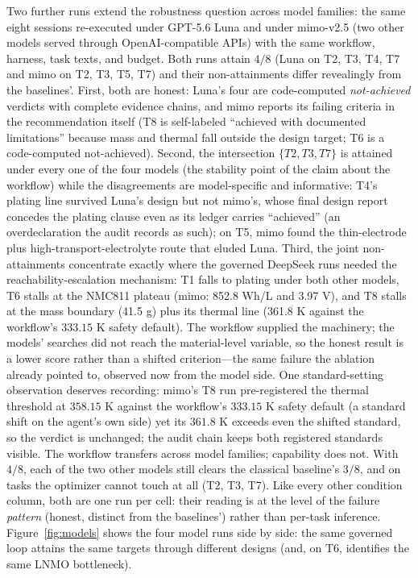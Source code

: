 Two further runs extend the robustness question across model families:
the same eight sessions re-executed under GPT-5.6 Luna and under
mimo-v2.5 (two other models served through OpenAI-compatible
APIs) with the same workflow, harness, task texts, and budget. Both runs
attain $4/8$ (Luna on T2, T3, T4, T7 and mimo on T2, T3, T5, T7) and
their non-attainments differ revealingly from the baselines'. First, both
are honest: Luna's four are code-computed \emph{not-achieved} verdicts with
complete evidence chains, and mimo reports its failing criteria in the
recommendation itself (T8 is self-labeled ``achieved with documented
limitations'' because mass and thermal fall outside the design target; T6 is a
code-computed not-achieved). Second, the intersection $\{T2, T3, T7\}$ is
attained under every one of the four models (the stability point of the
claim about the workflow) while the disagreements are model-specific and
informative: T4's plating line survived Luna's design but not mimo's, whose
final design report concedes the plating clause even as its ledger carries
``achieved'' (an overdeclaration the audit records as such); on T5, mimo
found the thin-electrode plus high-transport-electrolyte route that eluded
Luna. Third, the joint non-attainments concentrate exactly where the
governed DeepSeek runs needed the reachability-escalation mechanism: T1 falls to
plating under both other models, T6 stalls at the NMC811 plateau
(mimo: 852.8 Wh/L and 3.97 V), and T8 stalls at the mass boundary (41.5 g)
plus its thermal line (361.8 K against the workflow's $333.15$ K safety
default). The workflow supplied the machinery; the models' searches did not
reach the material-level variable, so the honest result is a lower score rather than
a shifted criterion---the same failure the ablation already pointed to,
observed now from the model side. One standard-setting observation deserves
recording: mimo's T8 run pre-registered the thermal threshold at $358.15$ K
against the workflow's $333.15$ K safety default (a standard shift on the
agent's own side) yet its $361.8$ K exceeds even the shifted standard, so
the verdict is unchanged; the audit chain keeps both registered standards
visible. The workflow transfers across model families; capability does not.
With $4/8$, each of the two other models still clears the classical baseline's
$3/8$, and on tasks the optimizer cannot touch at all (T2, T3, T7). Like
every other condition column, both are one run per cell: their reading
is at the level of the failure \emph{pattern} (honest, distinct from the
baselines') rather than per-task inference.
Figure~\ref{fig:models} shows the four model runs side by side: the same
governed loop attains the same targets through different designs (and, on
T6, identifies the same LNMO bottleneck).

